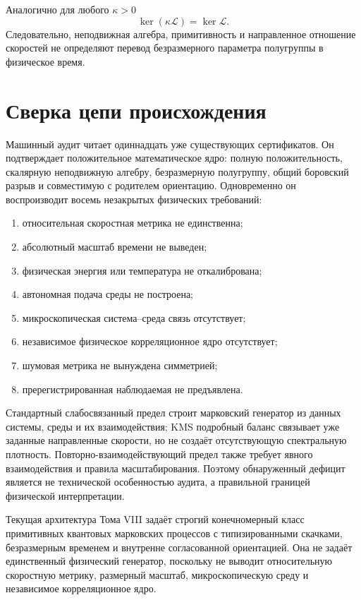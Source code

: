 Аналогично для любого $\kappa>0$
\begin{equation}
 \ker(\kappa\mathcal L)=\ker\mathcal L.
 \label{eq:v8-redteam-rate-rescaling}
\end{equation}
Следовательно, неподвижная алгебра, примитивность и направленное отношение
скоростей не определяют перевод безразмерного параметра полугруппы в
физическое время.

\section{Сверка цепи происхождения}

Машинный аудит читает одиннадцать уже существующих сертификатов. Он
подтверждает положительное математическое ядро: полную положительность,
скалярную неподвижную алгебру, безразмерную полугруппу, общий боровский
разрыв и совместимую с родителем ориентацию. Одновременно он воспроизводит
восемь незакрытых физических требований:
\begin{enumerate}
 \item относительная скоростная метрика не единственна;
 \item абсолютный масштаб времени не выведен;
 \item физическая энергия или температура не откалибрована;
 \item автономная подача среды не построена;
 \item микроскопическая система--среда связь отсутствует;
 \item независимое физическое корреляционное ядро отсутствует;
 \item шумовая метрика не вынуждена симметрией;
 \item пререгистрированная наблюдаемая не предъявлена.
\end{enumerate}

Стандартный слабосвязанный предел строит марковский генератор из данных
системы, среды и их взаимодействия; KMS подробный баланс связывает уже
заданные направленные скорости, но не создаёт отсутствующую спектральную
плотность. Повторно-взаимодействующий предел также требует явного взаимодействия
и правила масштабирования. Поэтому обнаруженный дефицит является не
технической особенностью аудита, а правильной границей физической
интерпретации.

\begin{theorem}
Текущая архитектура Тома VIII задаёт строгий конечномерный класс
примитивных квантовых марковских процессов с типизированными скачками,
безразмерным временем и внутренне согласованной ориентацией. Она не задаёт
единственный физический генератор, поскольку не выводит относительную
скоростную метрику, размерный масштаб, микроскопическую среду и независимое
корреляционное ядро.
\end{theorem}

